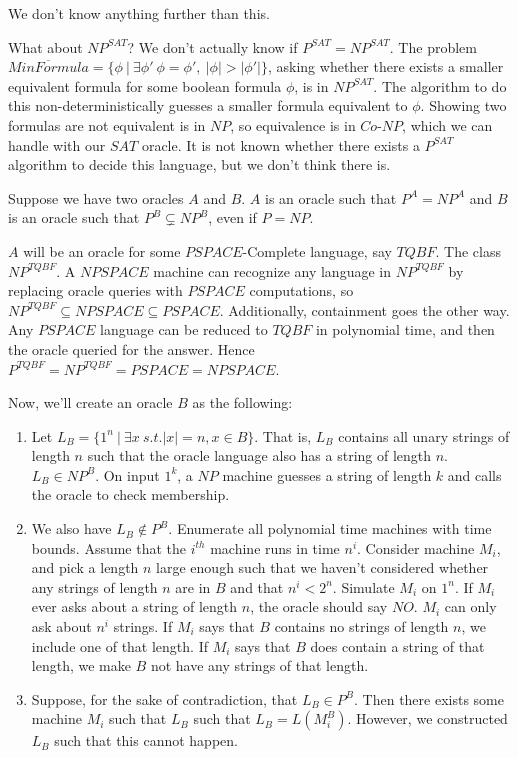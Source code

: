 We don't know anything further than this.

What about $NP^{SAT}$?  We don't actually know if $P^{SAT}=NP^{SAT}$.  The problem $\overline{MinFormula} = \{ \phi \ | \ \exists \phi' \ \phi=\phi',\ |\phi|>|\phi'|\}$, asking whether there exists a smaller equivalent formula for some boolean formula $\phi$, is in $NP^{SAT}$.  The algorithm to do this non-deterministically guesses a smaller formula equivalent to $\phi$.  Showing two formulas are not equivalent is in $NP$, so equivalence is in $Co$-$NP$, which we can handle with our $SAT$ oracle. It is not known whether there exists a $P^{SAT}$ algorithm to decide this language, but we don't think there is.

Suppose we have two oracles $A$ and $B$.  $A$ is an oracle such that $P^A=NP^A$ and $B$ is an oracle such that $P^B\subsetneq NP^B$, even if $P=NP$.

$A$ will be an oracle for some $PSPACE$-Complete language, say $TQBF$.  The class $NP^{TQBF}$.  A $NPSPACE$ machine can recognize any language in $NP^{TQBF}$ by replacing oracle queries with $PSPACE$ computations, so $NP^{TQBF}\subseteq NPSPACE\subseteq PSPACE$.  Additionally, containment goes the other way.  Any $PSPACE$ language can be reduced to $TQBF$ in polynomial time, and then the oracle queried for the answer.  Hence $P^{TQBF} = NP^{TQBF}=PSPACE=NPSPACE$.

Now, we'll create an oracle $B$ as the following:
\begin{enumerate}
	 
	
	\item[] Let $L_B=\{ 1^n \ | \ \exists x \ s.t.|x|=n,x\in B    \}$.  That is, $L_B$ contains all unary strings of length $n$ such that the oracle language also has a string of length $n$.  $L_B\in NP^B$.  On input $1^k$, a $NP$ machine guesses a string of length $k$ and calls the oracle to check membership.

\item[] We also have $L_B\notin P^B$.  Enumerate all polynomial time machines with time bounds.  Assume that the $i^{th}$ machine runs in time $n^i$.  Consider machine $M_i$, and pick a length $n$ large enough such that we haven't considered whether any strings of length $n$ are in $B$ and that $n^i<2^n$.  Simulate $M_i$ on $1^n$.  If $M_i$ ever asks about a string of length $n$, the oracle should say $NO$.  $M_i$ can only ask about $n^i$ strings.  If $M_i$ says that $B$ contains no strings of length $n$, we include one of that length.  If $M_i$ says that $B$ does contain a string of that length, we make $B$ not have any strings of that length.

\item[] Suppose, for the sake of contradiction, that $L_B\in P^B$.  Then there exists some machine $M_i$ such that $L_B$ such that $L_B=L(M_i^B)$.  However, we constructed $L_B$ such that this cannot happen.

\end{enumerate}

